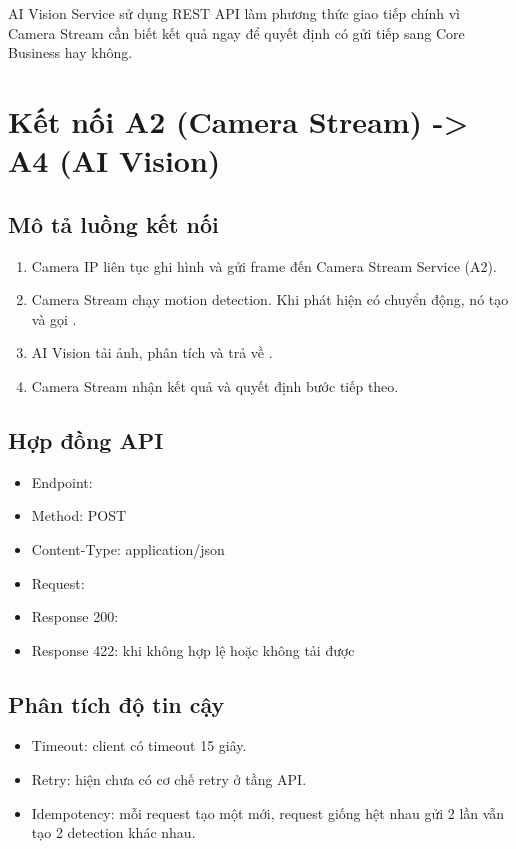 AI Vision Service sử dụng REST API làm phương thức giao tiếp chính vì Camera Stream cần biết kết quả ngay để quyết định có gửi tiếp sang Core Business hay không.

\section{Kết nối A2 (Camera Stream) -> A4 (AI Vision)}

\subsection{Mô tả luồng kết nối}

\begin{enumerate}
    \item Camera IP liên tục ghi hình và gửi frame đến Camera Stream Service (A2).
    \item Camera Stream chạy motion detection. Khi phát hiện có chuyển động, nó tạo  và gọi .
    \item AI Vision tải ảnh, phân tích và trả về .
    \item Camera Stream nhận kết quả và quyết định bước tiếp theo.
\end{enumerate}

\subsection{Hợp đồng API}

\begin{itemize}
    \item Endpoint: 
    \item Method: POST
    \item Content-Type: application/json
    \item Request: 
    \item Response 200: 
    \item Response 422:  khi  không hợp lệ hoặc không tải được
\end{itemize}

\subsection{Phân tích độ tin cậy}

\begin{itemize}
    \item Timeout:  client có timeout 15 giây.
    \item Retry: hiện chưa có cơ chế retry ở tầng API.
    \item Idempotency: mỗi request tạo một  mới, request giống hệt nhau gửi 2 lần vẫn tạo 2 detection khác nhau.
\end{itemize}

